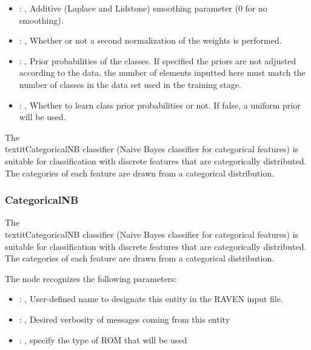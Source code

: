 \begin{itemize}
    \item {}: , 
      Additive (Laplace and Lidstone) smoothing parameter (0 for no smoothing).

    \item {}: , 
      Whether or not a second normalization of the weights is performed.

    \item {}: , 
      Prior probabilities of the classes. If specified the priors are
      not adjusted according to the data. \nb the number of elements inputted here must
      match the number of classes in the data set used in the training stage.

    \item {}: , 
      Whether to learn class prior probabilities or not. If false, a uniform
      prior will be used.
  \end{itemize}
 The \\textit{CategoricalNB} classifier (Naive Bayes classifier for categorical features)
 is suitable for classification with discrete features that are categorically distributed.
 The categories of each feature are drawn from a categorical distribution.

\subsubsection{CategoricalNB}
  The \\textit{CategoricalNB} classifier (Naive Bayes classifier for categorical features)
  is suitable for classification with discrete features that are categorically distributed.
  The categories of each feature are drawn from a categorical distribution.

  The  node recognizes the following parameters:
    \begin{itemize}
      \item {}: , 
        User-defined name to designate this entity in the RAVEN input file.
      \item {}: , 
        Desired verbosity of messages coming from this entity
      \item {}: , 
        specify the type of ROM that will be used
  \end{itemize}

